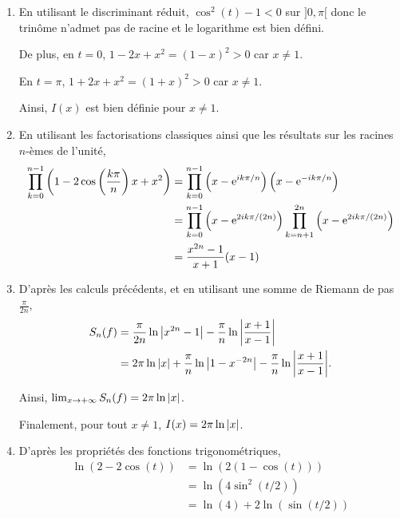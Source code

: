 \begin{solution}
\begin{enumerate}
\item En utilisant le discriminant réduit, $\cos^2(t) - 1 < 0$ sur $]0,\pi[$ donc le trinôme n'admet pas de racine et le logarithme est bien défini.

De plus, en $t = 0$, $1 - 2 x + x^2 = (1 - x)^2 > 0$ car $x \neq 1$.

En $t = \pi$, $1 + 2 x + x^2 = (1 + x)^2 > 0$ car $x \neq 1$.

Ainsi, $I(x)$ est bien définie pour $x \neq 1$.

\item En utilisant les factorisations classiques ainsi que les résultats sur les racines $n$-èmes de l'unité,
\begin{align*}
\prod_{k=0}^{n-1} \left(1 - 2 \cos\left(\frac{k\pi}{n}\right) x + x^2\right)
&= \prod_{k=0}^{n-1} \left(x - \mathrm{e}^{ik\pi/n}\right) \left(x - \mathrm{e}^{-ik\pi/n}\right) \\
&= \prod_{k=0}^{n-1} \left(x - \mathrm{e}^{2ik\pi/(2n)}\right) \prod_{k=n+1}^{2n} \left(x - \mathrm{e}^{2ik\pi/(2n)}\right) \\
&= \frac{x^{2n} - 1}{x + 1} (x - 1)
\end{align*}

\item D'après les calculs précédents, et en utilisant une somme de Riemann de pas $\frac{\pi}{2n}$,
\begin{align*}
S_n(f) &= \frac{\pi}{2n} \ln\abs{x^{2n}-1} - \frac{\pi}{n} \ln \abs{\frac{x+1}{x-1}} \\
&= 2 \pi \ln\abs{x} + \frac{\pi}{n} \ln \abs{1 - x^{-2n}} - \frac{\pi}{n} \ln \abs{\frac{x+1}{x-1}}.
\end{align*}

Ainsi, $\lim_{x\to +\infty} S_n(f) = 2 \pi \ln\abs{x}$.

Finalement, pour tout $x \neq 1$, $I(x) = 2 \pi \ln\abs{x}$.

\item D'après les propriétés des fonctions trigonométriques,
\begin{align*}
\ln(2 - 2 \cos(t)) &= \ln(2(1 - \cos(t))) \\
&= \ln(4 \sin^2(t/2)) \\
&= \ln(4) + 2 \ln(\sin(t/2))
\end{align*}


\end{enumerate}
\end{solution}
